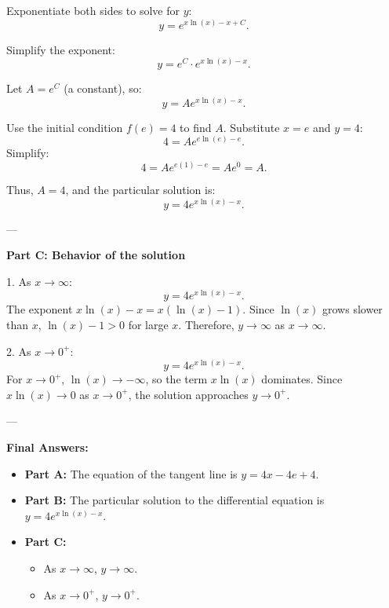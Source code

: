 \documentclass{article}
\begin{document}
Exponentiate both sides to solve for \(y\):
\[
y = e^{x \ln(x) - x + C}.
\]

Simplify the exponent:
\[
y = e^C \cdot e^{x \ln(x) - x}.
\]

Let \(A = e^C\) (a constant), so:
\[
y = A e^{x \ln(x) - x}.
\]

Use the initial condition \(f(e) = 4\) to find \(A\). Substitute \(x = e\) and \(y = 4\):
\[
4 = A e^{e \ln(e) - e}.
\]
Simplify:
\[
4 = A e^{e(1) - e} = A e^0 = A.
\]

Thus, \(A = 4\), and the particular solution is:
\[
y = 4 e^{x \ln(x) - x}.
\]

---

\textbf{Part C: Behavior of the solution}

1. As \(x \to \infty\):
   \[
   y = 4 e^{x \ln(x) - x}.
   \]
   The exponent \(x \ln(x) - x = x(\ln(x) - 1)\). Since \(\ln(x)\) grows slower than \(x\), \(\ln(x) - 1 > 0\) for large \(x\). Therefore, \(y \to \infty\) as \(x \to \infty\).

2. As \(x \to 0^+\):
   \[
   y = 4 e^{x \ln(x) - x}.
   \]
   For \(x \to 0^+\), \(\ln(x) \to -\infty\), so the term \(x \ln(x)\) dominates. Since \(x \ln(x) \to 0\) as \(x \to 0^+\), the solution approaches \(y \to 0^+\).

---

\textbf{Final Answers:}
\begin{itemize}
    \item \textbf{Part A:} The equation of the tangent line is \(y = 4x - 4e + 4\).
    \item \textbf{Part B:} The particular solution to the differential equation is \(y = 4 e^{x \ln(x) - x}\).
    \item \textbf{Part C:} 
    \begin{itemize}
        \item As \(x \to \infty\), \(y \to \infty\).
        \item As \(x \to 0^+\), \(y \to 0^+\).
    \end{itemize}
\end{itemize}


\newpage
\end{document}
